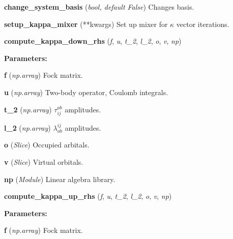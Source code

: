 \begin{tcolorbox}
{\begin{adjustwidth}{4em}{}
            \hspace{1.5em}\textbf{change\_system\_basis} (\emph{bool, default False})
            Changes basis.

        \end{adjustwidth}

    \hspace{2em} \textbf{setup\_kappa\_mixer} (**kwargs)
        Set up mixer for $\kappa$ vector iterations.


    \hspace{2em} \textbf{compute\_kappa\_down\_rhs} 
        (\emph{f}, \emph{u}, \emph{t\_2}, \emph{l\_2}, \emph{o}, \emph{v}, \emph{np})
        \begin{adjustwidth}{4em}{}
        
        \textbf{Parameters:}

            \hspace{1.5em} \textbf{f} (\emph{np.array}) Fock matrix.

            \hspace{1.5em} \textbf{u} (\emph{np.array})
                Two-body operator, Coulomb integrals. 

            \hspace{1.5em} \textbf{t\_2} (\emph{np.array}) $\tau^{ab}_{ij}$ amplitudes.

            \hspace{1.5em} \textbf{l\_2} (\emph{np.array}) $\lambda^{ij}_{ab}$ amplitudes.

            \hspace{1.5em} \textbf{o} (\emph{Slice}) Occupied arbitals.

            \hspace{1.5em} \textbf{v} (\emph{Slice}) Virtual orbitals.

            \hspace{1.5em} \textbf{np} (\emph{Module}) Linear algebra library.

        \end{adjustwidth}        

    \hspace{2em} \textbf{compute\_kappa\_up\_rhs} 
        (\emph{f}, \emph{u}, \emph{t\_2}, \emph{l\_2}, \emph{o}, \emph{v}, \emph{np})
        \begin{adjustwidth}{4em}{}
        
        \textbf{Parameters:}

            \hspace{1.5em} \textbf{f} (\emph{np.array}) Fock matrix.


\end{adjustwidth}}
\end{tcolorbox}
